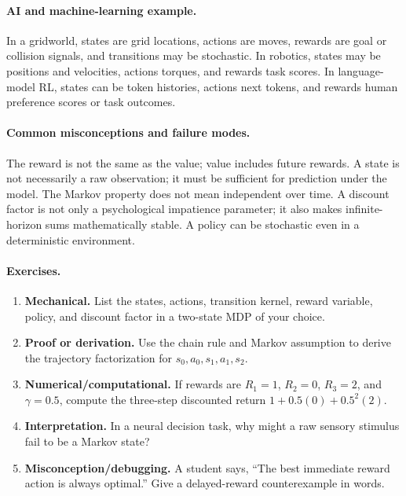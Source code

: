 \paragraph{AI and machine-learning example.}
In a gridworld, states are grid locations, actions are moves, rewards are goal or collision signals, and transitions may be stochastic. In robotics, states may be positions and velocities, actions torques, and rewards task scores. In language-model RL, states can be token histories, actions next tokens, and rewards human preference scores or task outcomes.

\paragraph{Common misconceptions and failure modes.}
The reward is not the same as the value; value includes future rewards. A state is not necessarily a raw observation; it must be sufficient for prediction under the model. The Markov property does not mean independent over time. A discount factor is not only a psychological impatience parameter; it also makes infinite-horizon sums mathematically stable. A policy can be stochastic even in a deterministic environment.

\paragraph{Exercises.}
\begin{enumerate}[label=\textbf{36.1.\arabic*.}, leftmargin=*]
\item \textbf{Mechanical.} List the states, actions, transition kernel, reward variable, policy, and discount factor in a two-state MDP of your choice.
\item \textbf{Proof or derivation.} Use the chain rule and Markov assumption to derive the trajectory factorization for \(s_0,a_0,s_1,a_1,s_2\).
\item \textbf{Numerical/computational.} If rewards are \(R_1=1\), \(R_2=0\), \(R_3=2\), and \(\gamma=0.5\), compute the three-step discounted return \(1+0.5(0)+0.5^2(2)\).
\item \textbf{Interpretation.} In a neural decision task, why might a raw sensory stimulus fail to be a Markov state?
\item \textbf{Misconception/debugging.} A student says, ``The best immediate reward action is always optimal.'' Give a delayed-reward counterexample in words.
\end{enumerate}

